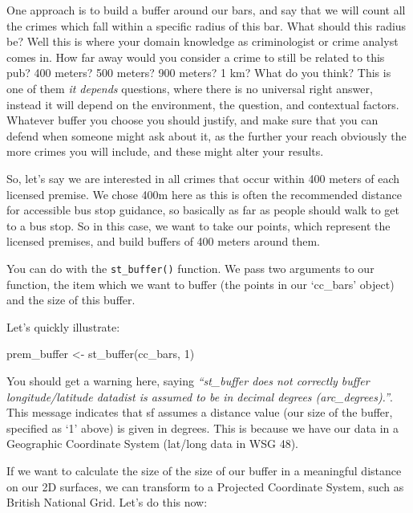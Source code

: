 \documentclass[
]{book}
\newenvironment{Shaded}{\begin{snugshade}}{\end{snugshade}}
\newcommand{\DecValTok}[1]{\textcolor[rgb]{0.00,0.00,0.81}{#1}}
\newcommand{\FunctionTok}[1]{\textcolor[rgb]{0.00,0.00,0.00}{#1}}
\newcommand{\NormalTok}[1]{#1}
\newcommand{\OtherTok}[1]{\textcolor[rgb]{0.56,0.35,0.01}{#1}}
\begin{document}
One approach is to build a buffer around our bars, and say that we will count all the crimes which fall within a specific radius of this bar. What should this radius be? Well this is where your domain knowledge as criminologist or crime analyst comes in. How far away would you consider a crime to still be related to this pub? 400 meters? 500 meters? 900 meters? 1 km? What do you think? This is one of them \emph{it depends} questions, where there is no universal right answer, instead it will depend on the environment, the question, and contextual factors. Whatever buffer you choose you should justify, and make sure that you can defend when someone might ask about it, as the further your reach obviously the more crimes you will include, and these might alter your results.

So, let's say we are interested in all crimes that occur within 400 meters of each licensed premise. We chose 400m here as this is often the recommended distance for accessible bus stop guidance, so basically as far as people should walk to get to a bus stop. So in this case, we want to take our points, which represent the licensed premises, and build buffers of 400 meters around them.

You can do with the \texttt{st\_buffer()} function. We pass two arguments to our function, the item which we want to buffer (the points in our `cc\_bars' object) and the size of this buffer.

Let's quickly illustrate:

\begin{Shaded}
\begin{Highlighting}[]
\NormalTok{prem\_buffer }\OtherTok{\textless{}{-}} \FunctionTok{st\_buffer}\NormalTok{(cc\_bars, }\DecValTok{1}\NormalTok{)}
\end{Highlighting}
\end{Shaded}

You should get a warning here, saying \emph{``st\_buffer does not correctly buffer longitude/latitude datadist is assumed to be in decimal degrees (arc\_degrees).''}. This message indicates that sf assumes a distance value (our size of the buffer, specified as `1' above) is given in degrees. This is because we have our data in a Geographic Coordinate System (lat/long data in WSG 48).

If we want to calculate the size of the size of our buffer in a meaningful distance on our 2D surfaces, we can transform to a Projected Coordinate System, such as British National Grid. Let's do this now:
\end{document}
